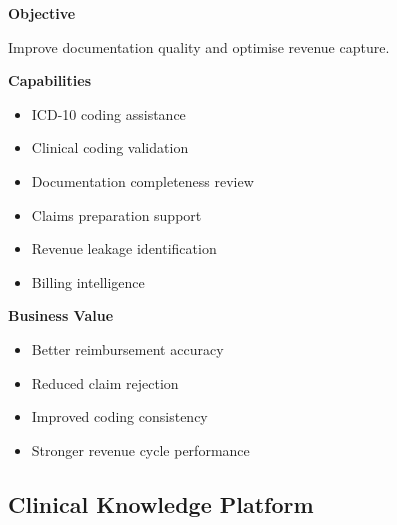 \begin{capability}

\textbf{Objective}

Improve documentation quality and optimise revenue capture.

\vspace{3mm}

\textbf{Capabilities}

\begin{itemize}

\item ICD-10 coding assistance

\item Clinical coding validation

\item Documentation completeness review

\item Claims preparation support

\item Revenue leakage identification

\item Billing intelligence

\end{itemize}

\vspace{3mm}

\textbf{Business Value}

\begin{itemize}

\item Better reimbursement accuracy

\item Reduced claim rejection

\item Improved coding consistency

\item Stronger revenue cycle performance

\end{itemize}

\end{capability}


\subsection{Clinical Knowledge Platform}

